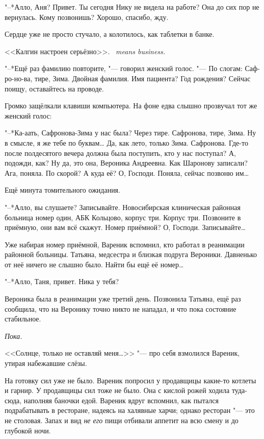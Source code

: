 "--*Алло, Аня?
Привет.
Ты сегодня Нику не видела на работе?
Она до сих пор не вернулась.
Кому позвонишь?
Хорошо, спасибо, жду.

Сердце уже не просто стучало, а колотилось, как таблетки в банке.

{<<Калгин настроен серьёзно>>.}
{\textit{\Kalgin\ means business.}}

"--*Ещё раз фамилию повторите, "--- говорил женский голос.
"--- По слогам: Саф-ро-но-ва, тире, Зима.
Двойная фамилия.
Имя пациента?
Год рождения?
Сейчас поищу, оставайтесь на проводе.

Громко защёлкали клавиши компьютера.
На фоне едва слышно прозвучал тот же женский голос:

"--*Ка-аать, Сафронова-Зима у нас была?
Через тире.
Сафронова, тире, Зима.
Ну в смысле, я же тебе по буквам\dots{}
Да, как лето, только Зима.
Сафронова.
Где-то после полдесятого вечера должна была поступить, кто у нас поступал?
А, подожди, как?
Ну да, это она, Вероника Андреевна.
Как Шаронову записали?
Ага, поняла.
По скорой?
А куда её?
О, Господи.
Поняла, сейчас позвоню им\dots{}

Ещё минута томительного ожидания.

"--*Алло, вы слушаете?
Записывайте.
Новосибирская клиническая районная больница номер один, АБК Кольцово, корпус три.
Корпус три.
Позвоните в приёмную, они вам всё скажут.
Номер приёмной?
О, Господи.
Записывайте\dots{}

Уже набирая номер приёмной, Вареник вспомнил, кто работал в реанимации районной больницы.
Татьяна, медсестра и близкая подруга Вероники.
Давненько от неё ничего не слышно было.
Найти бы ещё её номер\dots{}

"--*Алло, Таня, привет.
Ника у тебя?

\asterism

\textspace

\label{Wed_2012_06_13}

Вероника была в реанимации уже третий день.
Позвонила Татьяна, ещё раз сообщила, что на Веронику точно никто не нападал, и что пока состояние стабильное.

\emph{Пока.}

<<Солнце, только не оставляй меня\dots>> "--- про себя взмолился Вареник, утирая набежавшие слёзы.

На готовку сил уже не было.
Вареник попросил у продавщицы какие-то котлеты и гарнир.
У продавщицы сил тоже не было.
Она с кислой рожей ходила туда-сюда, наполняя баночки едой.
Вареник вдруг вспомнил, как пытался подрабатывать в ресторане, надеясь на халявные харчи;
однако ресторан "--- это не столовая.
Запах и вид \emph{не его} пищи отбивали аппетит на всю смену и до глубокой ночи.

